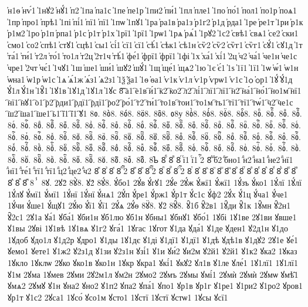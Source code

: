 {҆н1ѳ
҆нѵ́1
҆1нꙋ2
҆нꙋ́1
҆п2
҆1па
҆па1с
҆1пе
҆пе1р
҆1пи2
҆пи́1
҆1пл
҆пле1
҆1по
҆по́1
҆пол1
҆по1р
҆поѧ1
҆1пр
҆про1
҆прѣ1
҆1пі
҆пі́1
҆пї1
҆пї1
҆1пѡ
҆1пꙋ1
҆1ра
҆ра1в
҆ра1з
҆р1г2
҆р1д
҆рда1
҆1ре
҆ре1т
҆1ри
҆р1к
҆р1м2
҆1ро
҆р1п
҆рпа1
҆р1с
҆р1т
҆р1х
҆1рї1
҆1рї1
҆1рѡ1
҆1рѧ
҆рѧ́1
҆1рꙋ2
҆1с2
҆свѣ1
҆свѧ1
҆се2
҆ски1
҆смо1
҆со2
҆спѣ1
҆стꙋ1
҆сцѣ1
҆сы1
҆сі́1
҆сї1
҆сї1
҆сѣ́1
҆сѣк1
҆сѣ1н
҆сѷ2
҆сѷ2
҆сѷг1
҆сѷг1
҆сꙋ́1
҆сꙋ1д
҆1т
҆та́1
҆ти́1
҆т2л
҆то́1
҆то1л
҆т2ц
҆2т1ч
҆тѣ́1
҆фе́1
҆фрї1
҆фрї1
҆1фі
҆1х
҆ха́1
҆хі́1
҆2ц
҆ч2
҆ча́1
҆че1н
҆че1с
҆чре1
҆2чт
҆чє́1
҆1чꙋ1
҆1ш
҆ше1
҆ши́1
҆шꙋ2
҆шꙋ́1
҆1щ
҆ще́1
҆щѧ2
҆1ю
҆1є
҆є́1
҆1ѕ
҆1ї1
҆1ї1
҆1ѡ
҆ѡ́1
҆ѡ1н
҆ѡна1
҆ѡ1р
҆ѡ1с
҆1ѧ
҆ѧ́1ж
҆ѧ́з1
҆ѧ2з1
҆1ѯ
҆ѯа1
҆1ѳ
҆ѳа1
҆ѵ1к
҆ѵ1л
҆ѵ1р
҆ѵрѡ1
҆ѵ1с
҆1ѻ
҆ѻр1
҆1ꙋ́
҆ꙋ́1д
҆ꙋ́1л
҆ꙋ́1н
҆1ꙋ̑1
҆1ꙋ1в
҆1ꙋ1д
҆1ꙋ1л
҆1ꙋс
8҇
҇а1
҇е1в
҇и́1
҇к2
҇ко2
҇л2
҇лі́1
҇лї1
҇лї1
҇н2
҇на́1
҇но́1
҇но1м
҇нї1
҇нї1
҇нꙋ1
҇о1
҇р2
҇рди1
҇рдї1
҇рдї1
҇ро2
҇ро́1
҇т2
҇ти́1
҇то1в
҇тои1
҇то1м
҇ть1
҇тї1
҇тї1
҇тѡ́1
҇ч2
҇че1с
҇ш2
҇ша1
҇ше1
҇ь1
҇ї1
҇ї1
҇ꙋ1
8ᲂ.
8ᲂ̀8.
8ᲂ́8.
8ᲂ̈8.
8ᲂ̑8.
ᲂ8у  
8ᲂ҆̀8.
8ᲂ҆́8.
8ᲂ҆̈8.
8ᲂ҆̑8.
8ᲂⷠ.
8ᲂⷠ҇.
8ᲂⷡ.
8ᲂⷡ҇.
8ᲂⷢ.
8ᲂⷢ҇.
8ᲂⷣ.
8ᲂⷣ҇.
8ᲂⷤ.
8ᲂⷤ҇.
8ᲂⷥ.
8ᲂⷥ҇.
8ᲂⷦ.
8ᲂⷦ҇.
8ᲂⷧ.
8ᲂⷧ҇.
8ᲂⷨ.
8ᲂⷨ҇.
8ᲂⷩ.
8ᲂⷩ҇.
8ᲂⷪ.
8ᲂⷪ҇.
8ᲂⷫ.
8ᲂⷫ҇.
8ᲂⷬ.
8ᲂⷬ҇.
8ᲂⷭ.
8ᲂⷭ҇.
8ᲂⷮ.
8ᲂⷮ҇.
8ᲂⷯ.
8ᲂⷯ҇.
8ᲂⷰ.
8ᲂⷰ҇.
8ᲂⷱ.
8ᲂⷱ҇.
8ᲂⷲ.
8ᲂⷲ҇.
8ᲂⷳ.
8ᲂⷳ҇.
8ᲂⷴ.
8ᲂⷴ҇.
8ᲂⷵ.
8ᲂⷵ҇.
8ᲂⷶ.
8ᲂⷶ҇.
8ᲂⷷ.
8ᲂⷷ҇.
8ᲂⷸ.
8ᲂⷸ҇.
8ᲂⷹ.
8ᲂⷹ҇.
8ᲂⷺ.
8ᲂⷺ҇.
8ᲂⷻ.
8ᲂⷻ҇.
8ᲂⷼ.
8ᲂⷼ҇.
8ᲂⷽ.
8ᲂⷽ҇.
8ᲂⷾ.
8ᲂⷾ҇.
8ᲂⷿ.
8ᲂⷿ҇.
8ᲂꙴ.
8ᲂꙴ҇.
8ᲂꙵ.
8ᲂꙵ҇.
8ᲂꙶ.
8ᲂꙶ҇.
8ᲂꙷ.
8ᲂꙷ҇.
8ᲂꙸ.
8ᲂꙸ҇.
8ᲂꙹ.
8ᲂꙹ҇.
8ᲂꙺ.
8ᲂꙺ҇.
8ᲂꙻ.
8ᲂꙻ҇.
8ᲂ꙼.
8ᲂ꙼҇.
8ᲂ꙽.
8ᲂ꙽҇.
8ᲆ
8ⷠ
8ⷡ
8ⷢ
ⷢї1
ⷢї1
ⷢ҇2
8ⷣ
ⷣб2
ⷣбно1
ⷣн2
ⷣна1
ⷣне2
ⷣнї1
ⷣнї1
ⷣте́1
ⷣтї1
ⷣтї1
ⷣц2
ⷣце2
ⷣч2
8ⷤ
8ⷥ
8ⷦ
8ⷧ
ⷧ҇2
8ⷨ
8ⷩ
8ⷪ
ⷪ҇2
8ⷫ
8ⷬ
8ⷭ
ⷭ҇2
8ⷮ
8ⷯ
8ⷰ
8ⷱ
8ⷲ
8ⷳ
8ⷴ
8ⷵ
8ⷶ
8ⷷ
8ⷸ
8ⷹ
8ⷺ
8ⷻ
8ⷼ
8ⷽ
8ⷾ
8ⷿ
8ⸯ
8ꙋ.
2ꙋ2̀
8ꙋ̀8.
ꙋ2́
8ꙋ́8.
ꙋ́бо1
2ꙋ́в
ꙋ́гꙋ1
2ꙋ́е
2ꙋ́ж
ꙋ́жї1
ꙋ́жї1
1ꙋ́зъ
ꙋ́ко1
1ꙋ́лї
1ꙋ́лї
1ꙋ́лꙋ
ꙋ́мї1
ꙋ́мї1
1ꙋ́нї
1ꙋ́нї
ꙋ́нѧ1
2ꙋ́п
ꙋ́ре1
ꙋ́рж1
ꙋ́р1т
ꙋ́с1с
ꙋ́ф2
2ꙋ́х
ꙋ́1ц
ꙋ́ча1
ꙋ́че1
1ꙋ́чи
ꙋ́ше1
ꙋ́щꙋ1
2ꙋ́ю
ꙋ́ї1
ꙋ́ї1
2ꙋ́ѧ
2ꙋ́ѳ
8ꙋ̈8.
ꙋ2̑
8ꙋ̑8.
ꙋ̑1б
ꙋ̑2в1
1ꙋ̑ди
ꙋ̑1к
1ꙋ̑мн
ꙋ̑2н1
ꙋ̑2с1
2ꙋ1а
ꙋа́1
ꙋба́1
ꙋби1н
ꙋб1лю
ꙋб1н
ꙋбны1
ꙋбнꙋ1
ꙋбо́1
1ꙋбі
1ꙋ1ве
2ꙋ1ви
ꙋвше1
ꙋ1вы
2ꙋві
1ꙋ1вѣ
1ꙋ1вѧ
ꙋ1г2
ꙋга́1
1ꙋгас
1ꙋгот
ꙋ1да
ꙋда́1
ꙋ1де
ꙋден1
ꙋ2д1н
ꙋ1до
1ꙋдоб
ꙋдо1л
ꙋ1д2р
ꙋдро1
ꙋ1ды
1ꙋ1дє
ꙋ1ді
ꙋ1дї1
ꙋ1дї1
ꙋ1дѣ
ꙋдѣ1в
ꙋ1дꙋ2
2ꙋ1е
ꙋе́1
ꙋемо1
ꙋете1
ꙋ1ж2
ꙋ2з1д
ꙋ1зи
ꙋ2з1н
ꙋзі́1
ꙋ1и
ꙋи́2
ꙋи2м
ꙋ2й1
ꙋ2й1
ꙋ1к2
ꙋка2
1ꙋказ
1ꙋкло
1ꙋклѡ
2ꙋко
ꙋко1в
ꙋко1н
1ꙋкр
ꙋкра1
ꙋкі́1
ꙋкꙋ2
ꙋл1в
ꙋ1ле
ꙋле́1
1ꙋ1лї1
1ꙋ1лї1
ꙋ1м
2ꙋма
1ꙋмев
2ꙋми
2ꙋ2м1л
ꙋм2н
2ꙋмо2
2ꙋмъ
2ꙋмы
ꙋмі́1
2ꙋмѝ
2ꙋмѝ
2ꙋмѡ
ꙋмѣ̑1
ꙋмѧ2
2ꙋмꙋ
ꙋ1н
ꙋна2
ꙋно2
ꙋ1п2
ꙋпа2
ꙋпа́1
ꙋпо1
ꙋр1в
ꙋр1г
ꙋ1ре1
ꙋ1ри2
ꙋ1ро2
ꙋров1
ꙋр1т
ꙋ1с2
2ꙋса1
1ꙋсо́
ꙋсо1м
ꙋсто1
1ꙋстї
1ꙋстї
ꙋстѡ1
1ꙋсы
ꙋсї1
}
